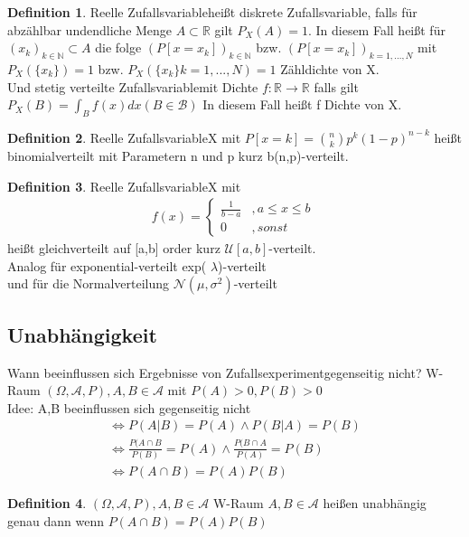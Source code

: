 \documentclass[a4paper,12pt,fleqn]{scrartcl}
\newcommand{\N}{\mathbb{N}}
\newcommand{\R}{\mathbb{R}}
\newcommand{\m}[1]{\mathcal{ #1 }}
\newcommand{\ZE}{Zufallsexperiment}
\newcommand{\ZV}{Zufallsvariable}
\theoremstyle{definition}
\newtheorem{definition}{Definition}[section]
\theoremstyle{plain}
\theoremstyle{remark}
\begin{document}
\begin{definition}
Reelle \ZV heißt diskrete \ZV, falls für abzählbar undendliche Menge $ A \subset \R $ gilt $ P_X(A) = 1 $. In diesem Fall heißt für $(x_k)_{k \in \N } \subset A $ die folge $ (P[x = x_k])_{k \in \N } $ bzw. $(P[x = x_k])_{k = 1,...,N } $ mit $P_X( \{ x_k \} ) = 1$ bzw. $P_X( \{ x_k \} k = 1,...,N ) = 1$ Zähldichte von X. \\
Und stetig verteilte \ZV mit Dichte $ f: \R \rightarrow \R $ falls gilt $ P_X(B) = \int_B f(x) dx ( B \in \m{B} ) $ In diesem Fall heißt f Dichte von X. 
\end{definition}

\begin{definition}
Reelle \ZV X mit $P[x = k] = \binom{n}{k} p^k (1-p)^{n-k}$ heißt binomialverteilt mit Parametern n und p kurz b(n,p)-verteilt.
\end{definition}
\begin{definition}
Reelle \ZV X mit
 \begin{align*}
f(x)=\begin{cases}\frac{1}{b-a}&,a\leq x\leq b\\
0&,sonst
\end{cases}\
\end{align*}
heißt gleichverteilt auf [a,b] order kurz $\m{U}[a,b]$-verteilt. \\
Analog für exponential-verteilt exp( $\lambda$)-verteilt \\
und für die Normalverteilung $ \m{N}( \mu , \sigma^2)$-verteilt
\end{definition}
\subsection{Unabhängigkeit}
Wann beeinflussen sich Ergebnisse von \ZE gegenseitig nicht? W-Raum $( \Omega , \m{A} , P), A,B \in \m{A} $ mit $ P(A) > 0, P(B) > 0$ \\
Idee: A,B beeinflussen sich gegenseitig nicht 
\begin{align*}
\Leftrightarrow P(A|B) = P(A) \land P(B|A) = P(B) \\
\Leftrightarrow \frac{P(A \cap B}{P(B)} = P(A) \land \frac{P(B \cap A}{P(A)} = P(B) \\
\Leftrightarrow P(A \cap B) = P(A)P(B)
\end{align*}

\begin{definition}
$( \Omega , \m{A} , P), A,B \in \m{A} $ W-Raum $ A,B \in \m{A} $ heißen unabhängig genau dann wenn $ P(A \cap B) = P(A)P(B) $
\end{definition}
\end{document}
